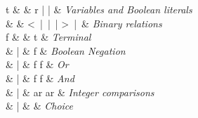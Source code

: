 \begin{syntax}
  t & \Coloneqq{} & r \quad|\quad \tru{} \quad|\quad \fls{}
  & \textit{Variables and Boolean literals} \\
  [1.5ex]
  \otimes & \Coloneqq{} & < \,\;|\;\; \leq \;\:\,|\;\; \geq \,\;|\;\;  > \,\;|\  \equiv & \emph{Binary relations}\\
  [1.5ex]


  f & \Coloneqq{} & t    & \textit{Terminal} \\
  & | & \neg{} f       & \textit{Boolean Negation} \\
  & | & f \vee{} f     & \textit{Or} \\
  & | & f \wedge{} f   & \textit{And} \\
  & | & ar \otimes{} ar  & \emph{Integer comparisons} \\
  & | &  & \textit{Choice} \\
\end{syntax}
